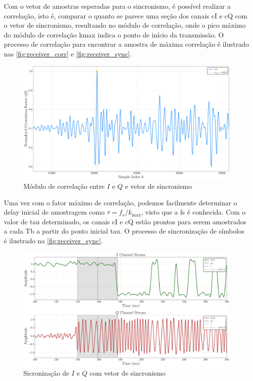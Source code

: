 Com o vetor de amostras esperadas para o sincronismo, é possível realizar a correlação, isto é, comparar o quanto se parece uma seção dos canais \gls{cI} e \gls{cQ} com o vetor de sincronismo, resultando no módulo de correlação, onde o pico máximo do módulo de correlação \gls{kmax} indica o ponto de início da transmissão. O processo de correlação para encontrar a amostra de máxima correlação é ilustrado nas \autoref{fig:receiver_corr} e \autoref{fig:receiver_sync}.

\begin{figure}[H]
	\centering
	\caption{Módulo de correlação entre $I$ e $Q$ e vetor de sincronismo}\label{fig:receiver_corr}
	\includegraphics[width=\linewidth]{assets/cap3/receiver_sync_corr.pdf}
\end{figure}

Uma vez com o fator máximo de correlação, podemos facilmente determinar o delay inicial de amostragem como $\tau = f_s / k_{\text{max}}$, visto que a \gls{fs} é conhecida. Com o valor de \gls{tau} determinado, os canais \gls{cI} e \gls{cQ} estão prontos para serem amostrados a cada \gls{Tb} a partir do ponto inicial \gls{tau}. O processo de sincronização de símbolos é ilustrado na \autoref{fig:receiver_sync}.

\begin{figure}[H]
	\centering
	\caption{Sicronização de $I$ e $Q$ com vetor de sincronismo}\label{fig:receiver_sync}
	\includegraphics[width=\linewidth]{assets/cap3/receiver_sync_time.pdf}
\end{figure}

